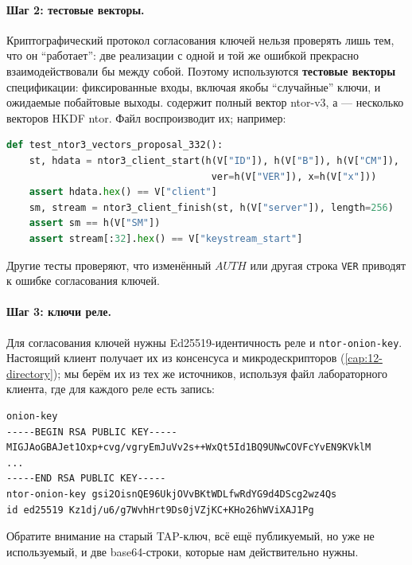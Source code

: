 \paragraph{Шаг 2: тестовые векторы.} Криптографический протокол согласования ключей нельзя проверять лишь тем, что он \enquote{работает}: две реализации с одной и той же ошибкой прекрасно взаимодействовали бы между собой. Поэтому используются \textbf{тестовые векторы} спецификации: фиксированные входы, включая якобы \enquote{случайные} ключи, и ожидаемые побайтовые выходы.  содержит полный вектор ntor-v3, а  --- несколько векторов HKDF ntor. Файл  воспроизводит их; например:
\begin{lstlisting}[language=Python]
def test_ntor3_vectors_proposal_332():
    st, hdata = ntor3_client_start(h(V["ID"]), h(V["B"]), h(V["CM"]),
                                    ver=h(V["VER"]), x=h(V["x"]))
    assert hdata.hex() == V["client"]
    sm, stream = ntor3_client_finish(st, h(V["server"]), length=256)
    assert sm == h(V["SM"])
    assert stream[:32].hex() == V["keystream_start"]
\end{lstlisting}
Другие тесты проверяют, что изменённый $\mathit{AUTH}$ или другая строка \texttt{VER} приводят к ошибке согласования ключей.

\paragraph{Шаг 3: ключи реле.} Для согласования ключей нужны Ed25519-идентичность реле и \texttt{ntor-onion-key}. Настоящий клиент получает их из консенсуса и микродескрипторов (\cref{cap:12-directory}); мы берём их из тех же источников, используя файл  лабораторного клиента, где для каждого реле есть запись:
\begin{lstlisting}[numbers=none]
onion-key
-----BEGIN RSA PUBLIC KEY-----
MIGJAoGBAJet1Oxp+cvg/vgryEmJuVv2s++WxQt5Id1BQ9UNwCOVFcYvEN9KVklM
...
-----END RSA PUBLIC KEY-----
ntor-onion-key gsi2OisnQE96UkjOVvBKtWDLfwRdYG9d4DScg2wz4Qs
id ed25519 Kz1dj/u6/g7WvhHrt9Ds0jVZjKC+KHo26hWViXAJ1Pg
\end{lstlisting}
Обратите внимание на старый TAP-ключ, всё ещё публикуемый, но уже не используемый, и две base64-строки, которые нам действительно нужны.

